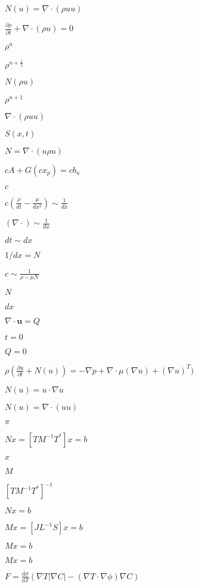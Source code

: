 \documentclass{article}
\begin{document}
$ N(u) = \nabla \cdot (\rho u u) $
\pagebreak

$ \frac{\partial \rho}{\partial t} + \nabla \cdot (\rho u) = 0 $
\pagebreak

$\rho^n$
\pagebreak

$\rho^{n+\frac{1}{2}}$
\pagebreak

$N(\rho u)$
\pagebreak

$\rho^{n+1}$
\pagebreak

$ \nabla \cdot (\rho u u)$
\pagebreak

$ S(x,t) $
\pagebreak

$N = \nabla \cdot (u \rho u)$
\pagebreak

$ c A + G(c x_p) = c b_u$
\pagebreak

$ c $
\pagebreak

$ c(\frac{\rho}{dt} - \frac{\mu}{dx^2}) \sim \frac{1}{dx} $
\pagebreak

$ (\nabla \cdot) \sim \frac{1}{dx} $
\pagebreak

$ dt \sim dx $
\pagebreak

$ 1/dx = N $
\pagebreak

$ c \sim \frac{1}{\rho - \mu N} $
\pagebreak

$ N $
\pagebreak

$ dx $
\pagebreak

$ \nabla \cdot \mathbf{u} = Q $
\pagebreak

$ t = 0 $
\pagebreak

$ Q = 0 $
\pagebreak

$\rho(\frac{\partial u}{\partial t} + N(u)) = -\nabla p + \nabla \cdot \mu (\nabla u) + (\nabla u)^T )$
\pagebreak

$ N(u) = u \cdot \nabla u $
\pagebreak

$ N(u) = \nabla \cdot (u u) $
\pagebreak

$ \pi $
\pagebreak

$ Nx = [T M^{-1} T^{*}]x = b $
\pagebreak

$ x $
\pagebreak

$ M $
\pagebreak

$ [T M^{-1} T^{*}]^{-1} $
\pagebreak

$ Nx = b $
\pagebreak

$ Mx = [J L^{-1} S]x = b $
\pagebreak

$ Mx=b $
\pagebreak

$ Mx = b $
\pagebreak

$ F = \frac{\mathrm{d} \sigma}{\mathrm{d} T}(\nabla T |\nabla C| - (\nabla T \cdot \nabla \phi) \nabla C)$
\pagebreak
\end{document}
